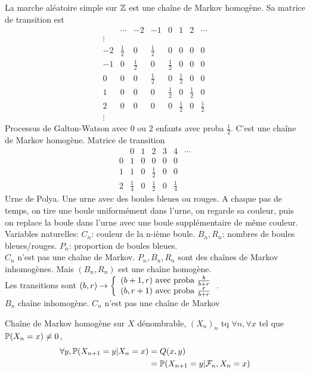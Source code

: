 \documentclass[]{report}
\begin{document}
    \begin{ex}{}{}
        La marche aléatoire simple sur $\mathbb{Z}$ est une chaîne de Markov homogène. Sa matrice de transition est
        \[\begin{matrix}
            &\cdots&-2&-1&0&1&2&\cdots\\
            \vdots&&&&&&&\\
            -2&\frac{1}{2}&0&\frac{1}{2}&0&0&0&0\\
            -1&0&\frac{1}{2}&0&\frac{1}{2}&0&0&0\\
            0&0&0&\frac{1}{2}&0&\frac{1}{2}&0&0\\
            1&0&0&0&\frac{1}{2}&0&\frac{1}{2}&0\\
            2&0&0&0&0&\frac{1}{2}&0&\frac{1}{2}\\
            \vdots&&&&&&&
        \end{matrix}\]
        Processus de Galton-Watson avec $0$ ou $2$ enfants avec proba $\frac{1}{2}$. C'est une chaîne de Markov homogène. Matrice de transition
        \[\begin{matrix}
            &0&1&2&3&4&\cdots\\
            0&1&0&0&0&0&\\
            1&1&0&\frac{1}{2}&0&0&\\
            2&\frac{1}{4}&0&\frac{1}{2}&0&\frac{1}{4}&
        \end{matrix}\]
        Urne de Polya. Une urne avec des boules bleues ou rouges. A chaque pas de temps, on tire une boule uniformément dans l'urne, on regarde sa couleur, puis on replace la boule dans l'urne avec une boule supplémentaire de même couleur.\\
        Variables naturelles: $C_n$: couleur de la n-ième boule. $B_n,R_n$: nombres de boules bleues/rouges. $P_n$: proportion de boules bleues.\\
        $C_n$ n'est pas une chaîne de Markov. $P_n,B_n,R_n$ sont des chaînes de Markov inhomogènes. Mais $(B_n,R_n)$ est une chaîne homogène.\\
        Les transitions sont $(b,r)\to\left\{\begin{array}{ll} (b+1,r)\text{ avec proba }\frac{b}{b+r}\\ (b,r+1)\text{ avec proba }\frac{r}{b+r} \end{array} \right.$.\\
        $B_n$ chaîne inhomogène. $C_n$ n'est pas une chaîne de Markov 
    \end{ex}

    \begin{df}{}{}
        Chaîne de Markov homogène sur $X$ dénombrable, $(X_n)_n$ tq $\forall n, \forall x$ tel que $\mathbb{P}(X_n=x)\neq 0$,
        \begin{align*}
            \forall y, \mathbb{P}(X_{n+1}=y|X_n=x)&=Q(x,y)\\
            &=\mathbb{P}(X_{n+1}=y|\mathcal{F}_n,X_n=x)
        \end{align*}
    \end{df}
\end{document}
